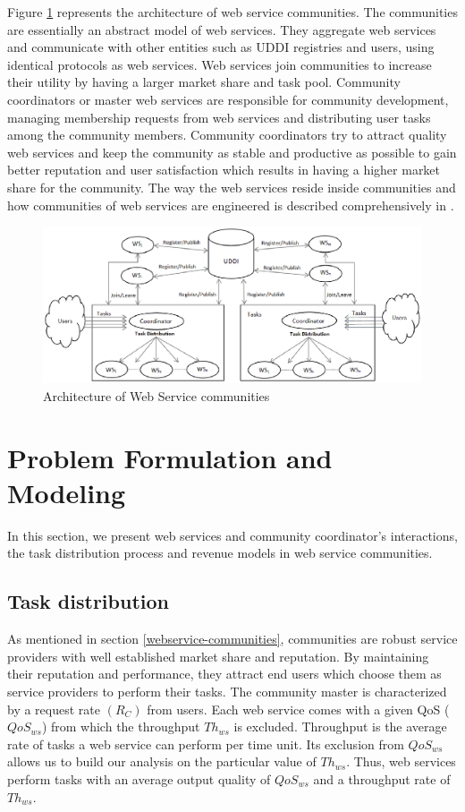 Figure \ref{fig_community} represents the architecture of web service communities. The communities are essentially an abstract model of web services. They aggregate web services and communicate with other entities such as UDDI registries and users, using identical protocols as web services. Web services join communities to increase their utility by having a larger market share and task pool. Community coordinators or master web services are responsible for community development, managing membership requests from web services and distributing user tasks among the community members. Community coordinators try to attract quality web services and keep the community as stable and productive as possible to gain better reputation and user satisfaction which results in having a higher market share for the community. The way the web services reside inside communities and how communities of web services are engineered is described comprehensively in \cite{DBLP:journals/ijebr/MaamarSTBB09}.

\begin{figure}[!t]
\centerline{\includegraphics[width=15cm]{Figures/community.eps}}
\caption{Architecture of Web Service communities}
\label{fig_community}
\end{figure}


\section{Problem Formulation and Modeling}\label{s:model}

In this section, we present  web services and community coordinator's interactions, the task distribution process and revenue models in web service communities.

\subsection{Task distribution}

As mentioned in section \ref{webservice-communities}, communities are robust service providers with well established market share and reputation. By maintaining their reputation and performance, they attract  end users which choose them as service providers to perform their tasks. The community master is characterized by a request rate $(R_C)$ from users. Each web service comes with a given QoS ($QoS_{ws}$) from which the throughput $Th_{ws}$ is excluded. Throughput is the average rate of tasks a web service can perform per time unit. Its exclusion from $QoS_{ws}$ allows us to build our analysis on the particular value of $Th_{ws}$. Thus, web services perform tasks with an average output quality of $QoS_{ws}$ and a throughput rate of $Th_{ws}$.

